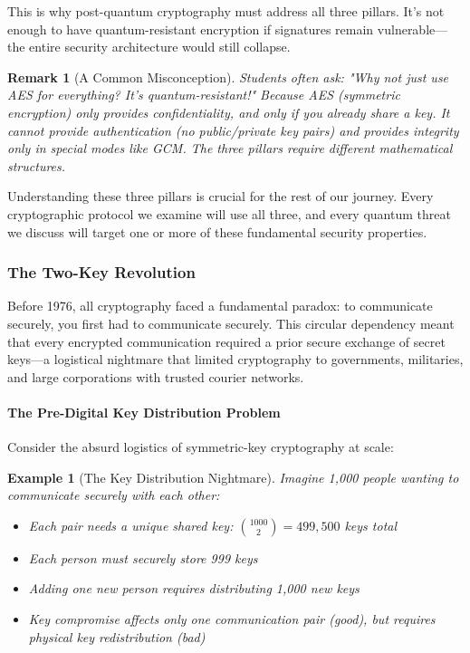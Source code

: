\documentclass[11pt,a4paper]{article}
\newtheorem{example}{Example}
\newtheorem{remark}{Remark}
\begin{document}
This is why post-quantum cryptography must address all three pillars. It's not enough to have quantum-resistant encryption if signatures remain vulnerable---the entire security architecture would still collapse.

\begin{remark}[A Common Misconception]
Students often ask: "Why not just use AES for everything? It's quantum-resistant!" Because AES (symmetric encryption) only provides confidentiality, and only if you already share a key. It cannot provide authentication (no public/private key pairs) and provides integrity only in special modes like GCM. The three pillars require different mathematical structures.
\end{remark}

Understanding these three pillars is crucial for the rest of our journey. Every cryptographic protocol we examine will use all three, and every quantum threat we discuss will target one or more of these fundamental security properties.


\subsubsection{The Two-Key Revolution}

Before 1976, all cryptography faced a fundamental paradox: to communicate securely, you first had to communicate securely. This circular dependency meant that every encrypted communication required a prior secure exchange of secret keys---a logistical nightmare that limited cryptography to governments, militaries, and large corporations with trusted courier networks.

\paragraph{The Pre-Digital Key Distribution Problem}

Consider the absurd logistics of symmetric-key cryptography at scale:

\begin{example}[The Key Distribution Nightmare]
Imagine 1,000 people wanting to communicate securely with each other:
\begin{itemize}
    \item Each pair needs a unique shared key: $\binom{1000}{2} = 499,500$ keys total
    \item Each person must securely store 999 keys
    \item Adding one new person requires distributing 1,000 new keys
    \item Key compromise affects only one communication pair (good), but requires physical key redistribution (bad)
\end{itemize}
\end{example}
\end{document}
